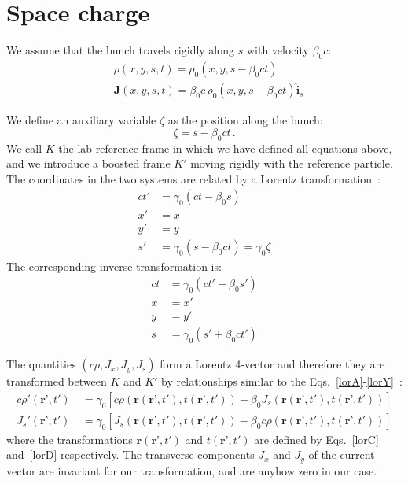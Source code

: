 \documentclass[a4paper,12pt]{report}
\begin{document}
\section{Space charge}



We assume that the bunch travels rigidly along $s$ with velocity $\beta_0 c$:
\begin{align}
&\rho\left(x, y, s, t\right) = \rho_0\left(x, y, s - \beta_0 ct\right) \label{rhorho0}\\
&\textbf{J}\left(x, y, s, t\right) = \beta_0c\, \rho_0\left(x, y, s - \beta_0 ct\right)  \hat{\textbf{i}}_s \label{JJ0}
\end{align}

We define an auxiliary variable $\zeta$ as the position along the bunch:
\begin{equation}
\zeta = s -\beta_0 c t \, .\label{zetadef}
\end{equation}
We call $K$ the lab reference frame in which we have defined all equations above, and we introduce a boosted frame $K'$ moving rigidly with the reference particle.
The coordinates in the two systems are related by a Lorentz transformation~\cite{jackson}:
\begin{align}
ct' &= \gamma_0 \left(ct -\beta_0 s \right)\label{lorA}\\
x' &= x\label{lorX}\\
y' &= y\label{lorY}\\
s' &= \gamma_0 \left(s -\beta_0 ct \right) = \gamma_0 \zeta\label{lorB}
\end{align}
The  corresponding inverse transformation is:
\begin{align}
ct &= \gamma_0 \left(ct' +\beta_0 s' \right)\label{lorC}\\
x &= x'\label{lorXinv}\\
y &= y'\label{lorYinv}\\
s &= \gamma_0 \left(s' +\beta_0 ct' \right)\label{lorD}
\end{align}



The quantities $\left(c \rho, J_x, J_y, J_s\right)$ form a Lorentz 4-vector and therefore they are transformed between $K$ and $K'$ by relationships similar to the Eqs.~\ref{lorA}-\ref{lorY}~\cite{jackson}:
\begin{align}
c\rho' \left(\textbf{r'}, t'\right)\ &= \gamma_0 \left[c \rho  \left(\textbf{r}\left(\textbf{r'}, t'\right), t\left(\textbf{r'}, t'\right)\right) -\beta_0 J_s \left(\textbf{r}\left(\textbf{r'}, t'\right), t\left(\textbf{r'}, t'\right)\right) \right]\label{lorrho}\\
J_s' \left(\textbf{r'}, t'\right)\ &= \gamma_0 \left[J_s  \left(\textbf{r}\left(\textbf{r'}, t'\right), t\left(\textbf{r'}, t'\right)\right) -\beta_0 c \rho \left(\textbf{r}\left(\textbf{r'}, t'\right), t\left(\textbf{r'}, t'\right)\right) \right]\label{lorjs}
\end{align}
where the transformations $\textbf{r}\left(\textbf{r'}, t'\right)$ and $t\left(\textbf{r'}, t'\right)$ are defined by Eqs.~\ref{lorC} and~\ref{lorD} respectively. The transverse components $J_x$ and $J_y$ of the current vector are invariant for our transformation, and are anyhow zero in our case.
\end{document}
